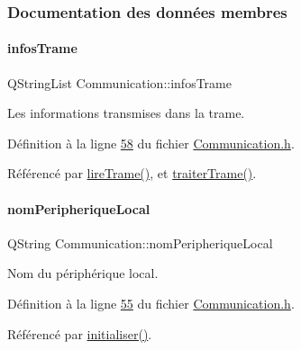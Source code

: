 \subsubsection{Documentation des données membres}
\mbox{\label{class_communication_a219fe9a4cd04470241f26f1f6159d721}} 
\paragraph{\texorpdfstring{infos\+Trame}{infosTrame}}
{\footnotesize\ttfamily Q\+String\+List Communication\+::infos\+Trame\hspace{0.3cm}{\ttfamily [private]}}



Les informations transmises dans la trame. 



Définition à la ligne \hyperlink{_communication_8h_source_l00058}{58} du fichier \hyperlink{_communication_8h_source}{Communication.\+h}.



Référencé par \hyperlink{_communication_8cpp_source_l00173}{lire\+Trame()}, et \hyperlink{_communication_8cpp_source_l00208}{traiter\+Trame()}.

\mbox{\label{class_communication_acfe0b2b569ebf174fcdd766272b89ba8}} 
\paragraph{\texorpdfstring{nom\+Peripherique\+Local}{nomPeripheriqueLocal}}
{\footnotesize\ttfamily Q\+String Communication\+::nom\+Peripherique\+Local\hspace{0.3cm}{\ttfamily [private]}}



Nom du périphérique local. 



Définition à la ligne \hyperlink{_communication_8h_source_l00055}{55} du fichier \hyperlink{_communication_8h_source}{Communication.\+h}.



Référencé par \hyperlink{_communication_8cpp_source_l00044}{initialiser()}.

